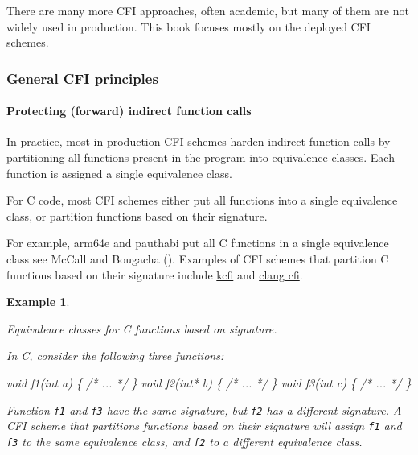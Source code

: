 \documentclass[
  a4paper,
]{report}
\newtheorem{example}{Example}
\newenvironment{Shaded}{}{}
\newcommand{\CommentTok}[1]{\textcolor[rgb]{0.38,0.63,0.69}{\textit{#1}}}
\newcommand{\DataTypeTok}[1]{\textcolor[rgb]{0.56,0.13,0.00}{#1}}
\newcommand{\NormalTok}[1]{#1}
\newcommand{\OperatorTok}[1]{\textcolor[rgb]{0.40,0.40,0.40}{#1}}
\begin{document}
There are many more CFI approaches, often academic, but many of them are
not widely used in production. This book focuses mostly on the deployed
CFI schemes.

\subsubsection{General CFI principles}\label{general-cfi-principles}

\paragraph{Protecting (forward) indirect function
calls}\label{protecting-forward-indirect-function-calls}

In practice, most in-production CFI schemes harden indirect function
calls by partitioning all functions present in the program into
\label{__index_entry_35}{equivalence
classes}. Each function is assigned a single
equivalence class.

For C code, most CFI schemes either put all functions into a single
equivalence class, or partition functions based on their
\label{__index_entry_36}{signature}.

For example,
\label{__index_entry_37}{arm64e} and
\label{__index_entry_38}{pauthabi} put
all C functions in a single equivalence class see McCall and Bougacha
(). Examples of CFI schemes that
partition C functions based on their signature include
\href{https://reviews.llvm.org/D119296}{kcfi} and
\href{https://clang.llvm.org/docs/ControlFlowIntegrityDesign.html\#forward-edge-cfi-for-indirect-function-calls}{clang
cfi}.

\begin{example}

\label{}

\textup{Equivalence classes for C functions based on signature.}

In C, consider the following three functions:

\begin{Shaded}
\begin{Highlighting}[]
\DataTypeTok{void}\NormalTok{ f1}\OperatorTok{(}\DataTypeTok{int}\NormalTok{ a}\OperatorTok{)} \OperatorTok{\{} \CommentTok{/* ... */} \OperatorTok{\}}
\DataTypeTok{void}\NormalTok{ f2}\OperatorTok{(}\DataTypeTok{int}\OperatorTok{*}\NormalTok{ b}\OperatorTok{)} \OperatorTok{\{} \CommentTok{/* ... */} \OperatorTok{\}}
\DataTypeTok{void}\NormalTok{ f3}\OperatorTok{(}\DataTypeTok{int}\NormalTok{ c}\OperatorTok{)} \OperatorTok{\{} \CommentTok{/* ... */} \OperatorTok{\}}
\end{Highlighting}
\end{Shaded}

Function \texttt{f1} and \texttt{f3} have the same signature, but
\texttt{f2} has a different signature. A CFI scheme that partitions
functions based on their signature will assign \texttt{f1} and
\texttt{f3} to the same equivalence class, and \texttt{f2} to a
different equivalence class.

\end{example}
\end{document}
